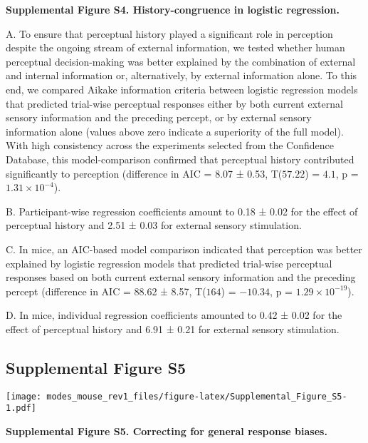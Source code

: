 \documentclass[
]{article}
\begin{document}
\textbf{Supplemental Figure S4. History-congruence in logistic
regression.}

A. To ensure that perceptual history played a significant role in
perception despite the ongoing stream of external information, we tested
whether human perceptual decision-making was better explained by the
combination of external and internal information or, alternatively, by
external information alone. To this end, we compared Aikake information
criteria between logistic regression models that predicted trial-wise
perceptual responses either by both current external sensory information
and the preceding percept, or by external sensory information alone
(values above zero indicate a superiority of the full model). With high
consistency across the experiments selected from the Confidence
Database, this model-comparison confirmed that perceptual history
contributed significantly to perception (difference in AIC = 8.07 ±
0.53, T(\(57.22\)) = \(4.1\), p = \(\ensuremath{1.31\times 10^{-4}}\)).

B. Participant-wise regression coefficients amount to 0.18 ± 0.02 for
the effect of perceptual history and 2.51 ± 0.03 for external sensory
stimulation.

C. In mice, an AIC-based model comparison indicated that perception was
better explained by logistic regression models that predicted trial-wise
perceptual responses based on both current external sensory information
and the preceding percept (difference in AIC = 88.62 ± 8.57, T(\(164\))
= \(-10.34\), p = \(\ensuremath{1.29\times 10^{-19}}\)).

D. In mice, individual regression coefficients amounted to 0.42 ± 0.02
for the effect of perceptual history and 6.91 ± 0.21 for external
sensory stimulation.

\newpage

\hypertarget{supplemental-figure-s5}{%
\subsection{Supplemental Figure S5}\label{supplemental-figure-s5}}

\texttt{[image: modes\_mouse\_rev1\_files/figure-latex/Supplemental\_Figure\_S5-1.pdf]}

\textbf{Supplemental Figure S5. Correcting for general response biases.}
\end{document}
